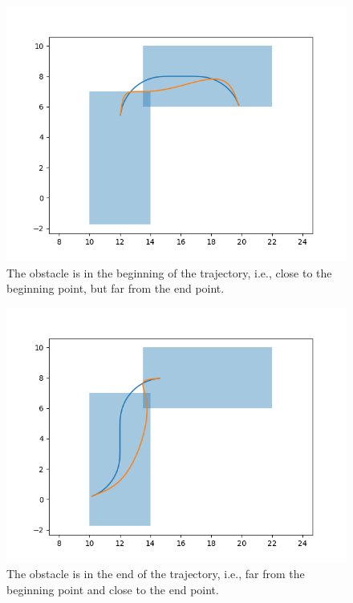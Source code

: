 \begin{figure}
    \centering
    \includegraphics[width=\linewidth]{figs/beginning_0_31.png}
    \caption{The obstacle is in the beginning of the trajectory, i.e., close to the beginning point, but far from the end point.}
    \label{fig:obstacle_beginning}
\end{figure}

\begin{figure}
    \centering
    \includegraphics[width=\linewidth]{figs/end_0_26.png}
    \caption{The obstacle is in the end of the trajectory, i.e., far from the beginning point and close to the end point.}
    \label{fig:obstacle_end}
\end{figure}
